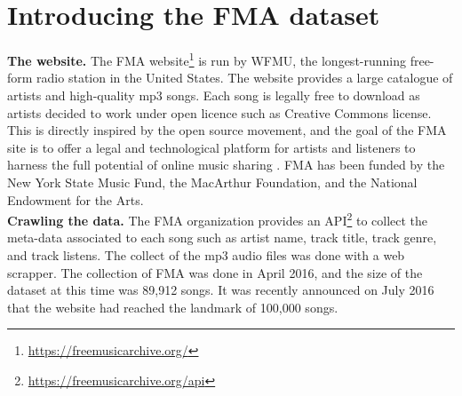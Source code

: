 \documentclass{article}
\begin{document}
\section{Introducing the FMA dataset}

\noindent
{\bf The website.} The FMA website\footnote{\url{https://freemusicarchive.org/}} is run by WFMU, the longest-running free-form radio station in the United States. The website provides a large catalogue of artists and high-quality mp3 songs. Each song is legally free to download as artists decided to work under open licence such as Creative Commons license. This is directly inspired by the open source movement, and the goal of the FMA site is to offer a legal and technological platform for artists and listeners to harness the full potential of online music sharing \cite{art:MossFMA}. FMA has been funded by the New York State Music Fund, the MacArthur Foundation, and the National Endowment for the Arts.\\



\noindent
{\bf Crawling the data.} The FMA organization provides an API\footnote{\url{https://freemusicarchive.org/api}} to collect the meta-data associated to each song such as artist name, track title, track genre, and track listens. The collect of the mp3 audio files was done with a web scrapper. The collection of FMA was done in April 2016, and the size of the dataset at this time was 89,912 songs. It was recently announced on July 2016 that the website had reached the landmark of 100,000 songs. \\
\end{document}
